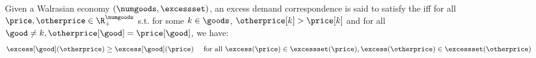 \begin{definition}\label{def:wgs}
    Given a Walrasian economy $(\numgoods, \excessset)$, an excess demand correspondence is said to satisfy the  iff for all $\price, \otherprice \in \R^\numgoods_+$ s.t. for some $k \in \goods$, $\otherprice[k] > \price[k]$ and for all $\good \neq k, \otherprice[\good] = \price[\good]$, we have:
    \begin{align}
        \excess[\good](\otherprice) \geq \excess[\good](\price) 
        && \text{ for all $\excess(\price) \in \excessset(\price), \excess(\otherprice) \in \excessset(\otherprice)$}
    \end{align}
\end{definition}

